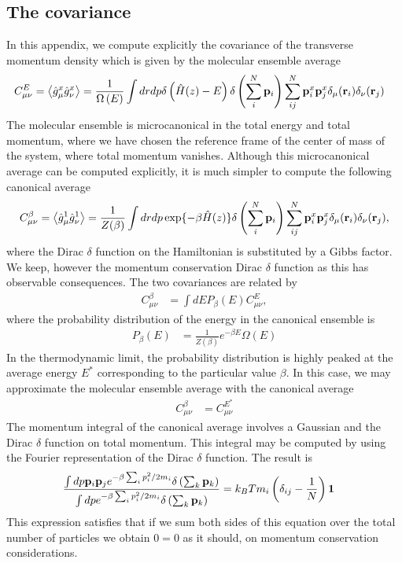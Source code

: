 \documentclass[b5paper,openright,10pt]{book}
\newcommand{\llangle}{\left\langle}
\newcommand{\rrangle}{\right\rangle}
\begin{document}
\begin{appendices}
\chapter{The covariance}
\label{Ap:Cov}
In  this  appendix,  we  compute   explicitly  the  covariance  of  the
transverse momentum density  which is given by  the molecular ensemble
average
\begin{align}
  C_{\mu\nu}^E&=\llangle \hat{g}_\mu^x\hat{g}_\nu^x\rrangle
=\frac{1}{\Omega\left(E\right)}
\int dr dp \delta\left(\hat{H}(z)-E\right)
\delta\left(\sum_i^N{\bf p}_i\right) 
\sum_{ij}^N{\bf p}_i^x{\bf p}_j^x\delta_{\mu}({\bf r}_i) 
\delta_{\nu}({\bf r}_j)
\end{align}
The molecular ensemble is microcanonical in the total energy and total
momentum, where  we have chosen the  reference frame of the  center of
mass  of the  system, where  total momentum  vanishes.  Although  this
microcanonical average can be computed  explicitly, it is much simpler
to compute the following canonical average
\begin{align}
  C_{\mu\nu}^\beta =\llangle \hat{g}_\mu^1\hat{g}_\nu^1\rrangle
=\frac{1}{Z(\beta)}
\int dr dp \exp\{-\beta\hat{H}(z)\}
\delta\left(\sum_i^N{\bf p}_i\right) 
\sum_{ij}^N{\bf p}_i^x{\bf p}_j^x\delta_{\mu}({\bf r}_i) 
\delta_{\nu}({\bf r}_j) ,
\end{align}
where the Dirac $\delta$ function on  the Hamiltonian is substituted by a
Gibbs factor. We  keep, however the momentum  conservation Dirac $\delta$
function as this has observable consequences.  The two covariances are
related by
\begin{align}
  C^{\beta}_{\mu\nu}&=\int dE P_\beta(E)
  C^{E}_{\mu\nu},
\end{align}
where the probability distribution of the energy in the canonical ensemble is
\begin{align}
P_\beta(E)&=  \frac{1}{Z(\beta)}e^{-\beta E}\Omega(E)
\end{align}
In the thermodynamic limit, the probability distribution is highly peaked
at the average energy $E^*$ corresponding to the particular value $\beta$. In this case, we may approximate the molecular
ensemble average with the canonical average
\begin{align}
  C^{\beta}_{\mu\nu}&=  C^{E^*}_{\mu\nu}
\end{align}
The momentum integral of the canonical average involves a Gaussian and the
Dirac $\delta$ function on total momentum. This integral may be computed by
using the Fourier representation of the Dirac $\delta$ function. The result
is
\begin{align}
  \frac{\int dp {\bf p}_i{\bf p}_je^{-\beta\sum_ip_i^2/2m_i}
\delta\left(\sum_k{\bf p}_k\right)}{\int dp e^{-\beta\sum_ip_i^2/2m_i}
\delta\left(\sum_k{\bf p}_k\right)}&=k_BT m_i\left(\delta_{ij}-\frac{1}{N}\right){\bf 1}
\label{momint}\end{align}
This expression satisfies  that if we sum both sides  of this equation
over the  total number of particles  we obtain $0=0$ as  it should, on
momentum conservation considerations.


\end{appendices}
\end{document}
